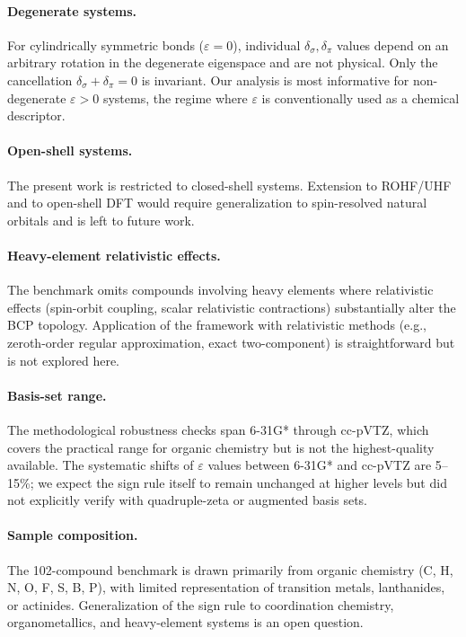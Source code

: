 \documentclass[11pt,a4paper]{article}
\newcommand{\delsg}{\delta_{\sigma}}
\newcommand{\delpi}{\delta_{\pi}}
\newcommand{\eps}{\varepsilon}
\begin{document}
\paragraph{Degenerate systems.}
For cylindrically symmetric bonds ($\eps = 0$), individual
$\delsg, \delpi$ values depend on an arbitrary rotation in the
degenerate eigenspace and are not physical. Only the cancellation
$\delsg + \delpi = 0$ is invariant. Our analysis is most
informative for non-degenerate $\eps > 0$ systems, the regime where
$\eps$ is conventionally used as a chemical descriptor.

\paragraph{Open-shell systems.}
The present work is restricted to closed-shell systems. Extension
to ROHF/UHF and to open-shell DFT would require generalization to
spin-resolved natural orbitals and is left to future work.

\paragraph{Heavy-element relativistic effects.}
The benchmark omits compounds involving heavy elements where
relativistic effects (spin-orbit coupling, scalar relativistic
contractions) substantially alter the BCP topology. Application of
the framework with relativistic methods (e.g., zeroth-order regular
approximation, exact two-component) is straightforward but is not
explored here.

\paragraph{Basis-set range.}
The methodological robustness checks span 6-31G* through cc-pVTZ,
which covers the practical range for organic chemistry but is not
the highest-quality available. The systematic shifts of $\eps$
values between 6-31G* and cc-pVTZ are 5--15\%; we expect the
sign rule itself to remain unchanged at higher levels but did not
explicitly verify with quadruple-zeta or augmented basis sets.

\paragraph{Sample composition.}
The 102-compound benchmark is drawn primarily from organic chemistry
(C, H, N, O, F, S, B, P), with limited representation of transition
metals, lanthanides, or actinides. Generalization of the sign rule
to coordination chemistry, organometallics, and heavy-element systems
is an open question.
\end{document}
